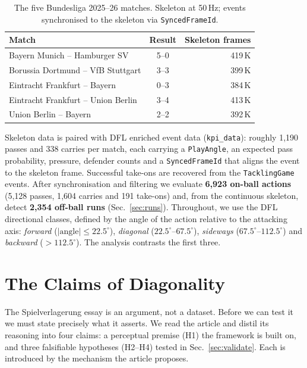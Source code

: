 \documentclass[11pt]{article}
\begin{document}
\begin{table}[H]
  \centering
  \caption{The five Bundesliga 2025--26 matches. Skeleton at 50\,Hz;
  events synchronised to the skeleton via \texttt{SyncedFrameId}.}
  \label{tab:matches}
  \begin{tabular}{lcr}
    \toprule
    Match & Result & Skeleton frames \\
    \midrule
    Bayern Munich -- Hamburger SV       & 5--0 & 419\,K \\
    Borussia Dortmund -- VfB Stuttgart  & 3--3 & 399\,K \\
    Eintracht Frankfurt -- Bayern       & 0--3 & 384\,K \\
    Eintracht Frankfurt -- Union Berlin & 3--4 & 413\,K \\
    Union Berlin -- Bayern              & 2--2 & 392\,K \\
    \bottomrule
  \end{tabular}
\end{table}

Skeleton data is paired with DFL enriched event data
(\texttt{kpi\_data}): roughly 1{,}190 passes and 338 carries per match,
each carrying a \texttt{PlayAngle}, an expected pass probability, pressure,
defender counts and a \texttt{SyncedFrameId} that aligns the event to the
skeleton frame. Successful take-ons are recovered from the
\texttt{TacklingGame} events. After synchronisation and filtering we
evaluate \textbf{6{,}923 on-ball actions} (5{,}128 passes, 1{,}604
carries and 191 take-ons) and, from the continuous skeleton, detect
\textbf{2{,}354 off-ball runs} (Sec.~\ref{sec:runs}). Throughout, we use
the DFL directional classes, defined by the angle of the action relative
to the attacking axis: \emph{forward} ($|\text{angle}|\le22.5^\circ$),
\emph{diagonal} ($22.5^\circ$--$67.5^\circ$), \emph{sideways}
($67.5^\circ$--$112.5^\circ$) and \emph{backward} ($>112.5^\circ$). The
analysis contrasts the first three.

\section{The Claims of Diagonality}
\label{sec:claims}

The Spielverlagerung essay is an argument, not a dataset. Before we can
test it we must state precisely what it asserts. We read the article and
distil its reasoning into four claims: a perceptual premise (H1) the
framework is built on, and three falsifiable hypotheses (H2--H4) tested in
Sec.~\ref{sec:validate}. Each is introduced by the mechanism the article
proposes.
\end{document}
